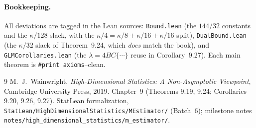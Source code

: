 \documentclass[11pt]{article}
\theoremstyle{definition}
\begin{document}
\paragraph{Bookkeeping.} All deviations are tagged in the Lean sources:
\texttt{Bound.lean} (the $144$/$32$ constants and the $\kappa/128$ slack, with the
$\kappa/4=\kappa/8+\kappa/16+\kappa/16$ split), \texttt{DualBound.lean} (the $\kappa/32$ slack of
Theorem~9.24, which \emph{does} match the book), and \texttt{GLMCorollaries.lean} (the
$\lambda=4BC\{\cdots\}$ reuse in Corollary~9.27). Each main theorem is \texttt{\#print axioms}--clean.

\begin{thebibliography}{9}
 M.~J.\ Wainwright, \emph{High-Dimensional Statistics: A Non-Asymptotic Viewpoint},
Cambridge University Press, 2019. Chapter~9 (Theorems 9.19, 9.24; Corollaries 9.20, 9.26, 9.27).
 StatLean formalization, \texttt{StatLean/HighDimensionalStatistics/MEstimator/}
(Batch~6); milestone notes \texttt{notes/high\_dimensional\_statistics/m\_estimator/}.
\end{thebibliography}
\end{document}
